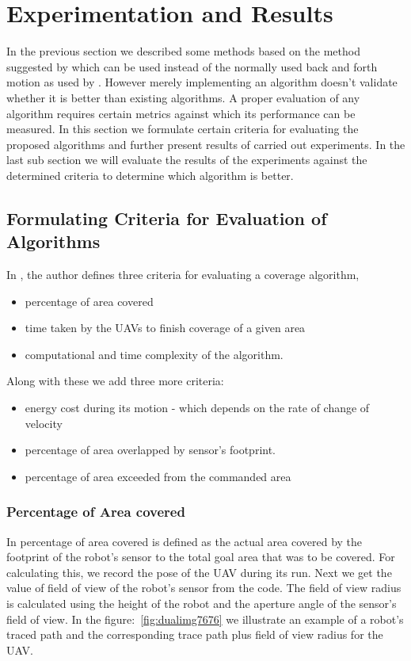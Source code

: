 \section{Experimentation and Results} 
%
%
%
%
%
In the previous section we described some methods based on the method suggested by \cite{6} which can be used instead of the normally used back and forth motion as used by \cite{2,3,4,10}. However merely implementing an algorithm doesn't validate whether it is better than existing algorithms. A proper evaluation of any algorithm requires certain metrics against which its performance can be measured. In this section we formulate certain criteria for evaluating the proposed algorithms and further present results of carried out experiments. In the last sub section we will evaluate the results of the experiments against the determined criteria to determine which algorithm is better.

\subsection{Formulating Criteria for Evaluation of Algorithms}
\label{sec:adadadada}
In \cite{1}, the author defines three criteria for evaluating a coverage algorithm,
\begin{itemize}
\item percentage of area covered
\item time taken by the UAVs to finish coverage of a given area
\item computational and time complexity of the algorithm.
\end{itemize}
Along with these we add three more criteria:
\begin{itemize}
\item energy cost during its motion - which depends on the rate of change of velocity
\item percentage of area overlapped by sensor's footprint.
\item percentage of area exceeded from the commanded area
\end{itemize}
\subsubsection{Percentage of Area covered}
In \cite{1,6} percentage of area covered is defined as the actual area covered by the footprint of the robot's sensor to the total goal area that was to be covered. For calculating this, we record the pose of the UAV during its run. Next we get the value of field of view of the robot's sensor from the code. The field of view radius is calculated using the height of the robot and the aperture angle of the sensor's field of view. In the figure:~\ref{fig:dualimg7676} we illustrate an example of a robot's traced path and the corresponding trace path plus field of view radius for the UAV. 


